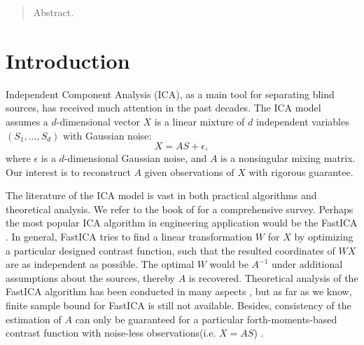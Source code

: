 \documentclass[twoside]{article}
\theoremstyle{definition}
\begin{document}
%

%


\begin{abstract}
Abstract.
\end{abstract}

\section{Introduction}
\label{sec:Intro}
Independent Component Analysis (ICA), as a main tool for separating blind sources, has received much attention in the past decades. 
The ICA model assumes a $d$-dimensional vector $X$ is a linear mixture of $d$ independent variables $(S_1,\ldots, S_d)$ with Gaussian noise:
\[
X = AS+\epsilon,
\]
where $\epsilon$ is a $d$-dimensional Gaussian noise, and $A$ is a nonsingular mixing matrix.
Our interest is to reconstruct $A$ given observations of $X$ with rigorous guarantee.

The literature of the ICA model is vast in both practical algorithms and theoretical analysis. 
We refer to the book of \citet{comon2010handbook} for a comprehensive survey.
Perhaps the most popular ICA algorithm in engineering application would be the FastICA \citep{hyvarinen1999fast}. 
In general, FastICA tries to find a linear transformation $W$ for $X$ by optimizing a particular designed contrast function, 
such that the resulted coordinates of $WX$ are as independent as possible. 
The optimal $W$ would be $A^{-1}$ under additional assumptions about the sources, thereby $A$ is recovered.  
Theoretical analysis of the FastICA algorithm has been conducted in many aspects \citep{tichavsky2006performance,oja2006fastica,ollila2010deflation,dermoune2013fastica,wei2014convergence}, 
but as far as we know, finite sample bound for FastICA is still not available.
Besides, consistency of the estimation of $A$ can only be guaranteed for a particular forth-moments-based contrast function with noise-less observations(i.e. $X = AS$) \citep{miettinen2014fourth}. 
\end{document}
